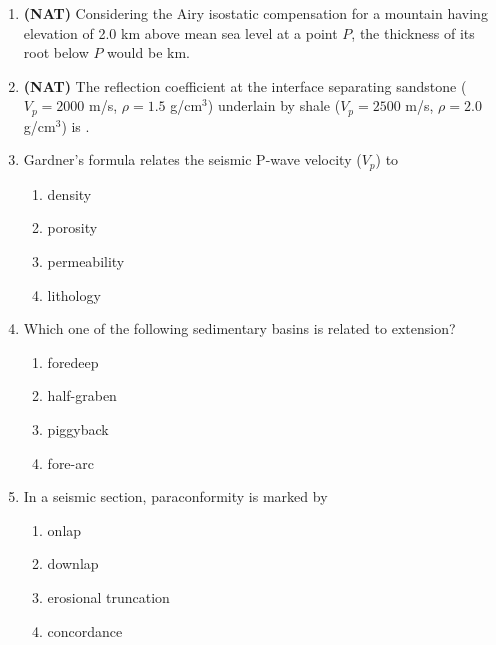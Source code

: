 \documentclass[journal,12pt,onecolumn]{IEEEtran}
\theoremstyle{remark}
\begin{document}
\begin{enumerate}
\item \textbf{(NAT)} Considering the Airy isostatic compensation for a mountain having elevation of 2.0 km above mean sea level at a point \(P\), the thickness of its root below \(P\) would be \underline{\hspace{3cm}} km.  
\vspace{0.5cm}

\item \textbf{(NAT)} The reflection coefficient at the interface separating sandstone (\(V_p = 2000\) m/s, \(\rho = 1.5\) g/cm\(^3\)) underlain by shale (\(V_p = 2500\) m/s, \(\rho = 2.0\) g/cm\(^3\)) is \underline{\hspace{3cm}}.  
\vspace{0.5cm}

\item Gardner's formula relates the seismic P-wave velocity (\(V_p\)) to  
\begin{multicols}{2}
\begin{enumerate}
\item density  
\item porosity  
\item permeability  
\item lithology  
\end{enumerate}
\end{multicols}

\item Which one of the following sedimentary basins is related to extension?  
\begin{multicols}{2}
\begin{enumerate}
\item foredeep  
\item half-graben  
\item piggyback  
\item fore-arc  
\end{enumerate}
\end{multicols}

\item In a seismic section, paraconformity is marked by  
\begin{multicols}{2}
\begin{enumerate}
\item onlap  
\item downlap  
\item erosional truncation  
\item concordance  
\end{enumerate}
\end{multicols}

\end{enumerate}
\end{document}
